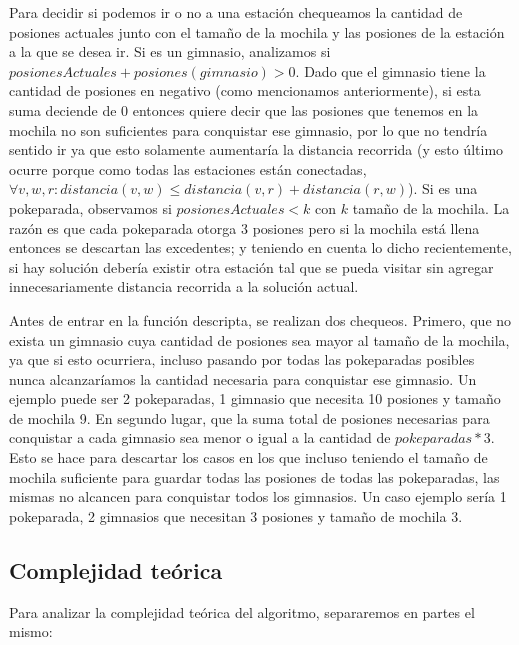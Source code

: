 \begin{itemize}
            Para decidir si podemos ir o no a una estación chequeamos la cantidad de posiones actuales junto con el tamaño de la mochila y las posiones de la estación a la que se desea ir. Si es un gimnasio, analizamos si $posionesActuales + posiones(gimnasio) > 0$. Dado que el gimnasio tiene la cantidad de posiones en negativo (como mencionamos anteriormente), si esta suma deciende de 0 entonces quiere decir que las posiones que tenemos en la mochila no son suficientes para conquistar ese gimnasio, por lo que no tendría sentido ir ya que esto solamente aumentaría la distancia recorrida (y esto último ocurre porque como todas las estaciones están conectadas,  $\forall v,w,r : distancia(v,w) \leq distancia(v,r) + distancia(r,w)$). Si es una pokeparada, observamos si $posionesActuales < k$ con $k$ tamaño de la mochila. La razón es que cada pokeparada otorga 3 posiones pero si la mochila está llena entonces se descartan las excedentes; y teniendo en cuenta lo dicho recientemente, si hay solución debería existir otra estación tal que se pueda visitar sin agregar innecesariamente distancia recorrida a la solución actual.

            Antes de entrar en la función descripta, se realizan dos chequeos. Primero, que no exista un gimnasio cuya cantidad de posiones sea mayor al tamaño de la mochila, ya que si esto ocurriera, incluso pasando por todas las pokeparadas posibles nunca alcanzaríamos la cantidad necesaria para conquistar ese gimnasio. Un ejemplo puede ser 2 pokeparadas, 1 gimnasio que necesita 10 posiones y tamaño de mochila 9. En segundo lugar, que la suma total de posiones necesarias para conquistar a cada gimnasio sea menor o igual a la cantidad de $pokeparadas*3$. Esto se hace para descartar los casos en los que incluso teniendo el tamaño de mochila suficiente para guardar todas las posiones de todas las pokeparadas, las mismas no alcancen para conquistar todos los gimnasios. Un caso ejemplo sería 1 pokeparada, 2 gimnasios que necesitan 3 posiones y tamaño de mochila 3.


    \subsection{Complejidad teórica}

      Para analizar la complejidad teórica del algoritmo, separaremos en partes el mismo:


\end{itemize}
